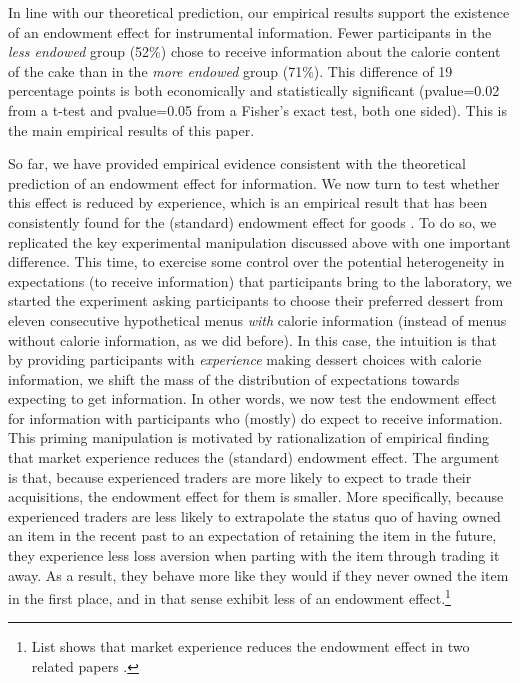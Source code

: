 In line with our theoretical prediction, our empirical results support the existence of an endowment effect for instrumental information. Fewer participants in the \emph{less endowed} group (52\%) chose to receive information about the calorie content of the cake than in the \emph{more endowed} group (71\%). This difference of 19 percentage points is both economically and statistically significant (pvalue=0.02 from a t-test and pvalue=0.05 from a Fisher’s exact test, both one sided). This is the main empirical results of this paper.


So far, we have provided empirical evidence consistent with the theoretical prediction of an endowment effect for information. We now turn to test whether this effect is reduced by experience, which is an empirical result that has been consistently found for the (standard) endowment effect for goods \citep{listDoesMarketExperience2003, engelmannReconsideringEffectMarket2010, listDoesMarketExperience2011}. To do so, we replicated the key experimental manipulation discussed above with one important difference. This time, to exercise some control over the potential heterogeneity in expectations (to receive information) that participants bring to the laboratory, we started the experiment asking participants to choose their preferred dessert from eleven consecutive hypothetical menus \emph{with} calorie information (instead of menus without calorie information, as we did before).  In this case, the intuition is that by providing participants with \emph{experience} making dessert choices with calorie information, we shift the mass of the distribution of expectations towards expecting to get information. In other words, we now test the endowment effect for information with participants who (mostly) do expect to receive information. This priming manipulation is motivated by  rationalization of  empirical finding that market experience reduces the (standard) endowment effect. The argument is that, because experienced traders are more likely to expect to trade their acquisitions, the endowment effect for them is smaller. More specifically, because experienced traders are less likely to extrapolate the status quo of having owned an item in the recent past to an expectation of retaining the item in the future, they experience less loss aversion when parting with the item through trading it away. As a result, they behave more like they would if they never owned the item in the first place, and in that sense exhibit less of an endowment effect.\footnote{List shows that market experience reduces the endowment effect in two related papers \citep{listDoesMarketExperience2003, listDoesMarketExperience2011}.
}

